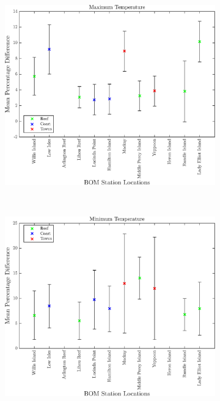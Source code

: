 \begin{figure}[!hbt]
    \centering
    \begin{subfigure}[b]{0.45\textwidth}
    	\includegraphics[width=\textwidth]{Fig/Research/BomComparison/MaxTemp_PercentageDiffMean.eps}
	    \caption{}
	    \label{subfig:maxtlucpoint}
    \end{subfigure}
    ~~~
    \begin{subfigure}[b]{0.45\textwidth}
    	\includegraphics[width=\textwidth]{Fig/Research/BomComparison/MinTemp_PercentageDiffMean.eps}

\end{subfigure}
\end{figure}
